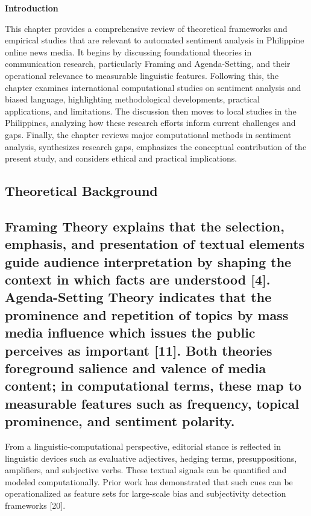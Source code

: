 \textbf{Introduction}

This chapter provides a comprehensive review of theoretical frameworks and empirical studies that are relevant to automated sentiment analysis in Philippine online news media. It begins by discussing foundational theories in communication research, particularly Framing and Agenda-Setting, and their operational relevance to measurable linguistic features. Following this, the chapter examines international computational studies on sentiment analysis and biased language, highlighting methodological developments, practical applications, and limitations. The discussion then moves to local studies in the Philippines, analyzing how these research efforts inform current challenges and gaps. Finally, the chapter reviews major computational methods in sentiment analysis, synthesizes research gaps, emphasizes the conceptual contribution of the present study, and considers ethical and practical implications.

\subsection{\texorpdfstring{\textbf{Theoretical Background}}{Theoretical Background}}\label{theoretical-background}

\subsection{Framing Theory explains that the selection, emphasis, and presentation of textual elements guide audience interpretation by shaping the context in which facts are understood {[}4{]}. Agenda-Setting Theory indicates that the prominence and repetition of topics by mass media influence which issues the public perceives as important {[}11{]}. Both theories foreground salience and valence of media content; in computational terms, these map to measurable features such as frequency, topical prominence, and sentiment polarity.}\label{framing-theory-explains-that-the-selection-emphasis-and-presentation-of-textual-elements-guide-audience-interpretation-by-shaping-the-context-in-which-facts-are-understood-4.-agenda-setting-theory-indicates-that-the-prominence-and-repetition-of-topics-by-mass-media-influence-which-issues-the-public-perceives-as-important-11.-both-theories-foreground-salience-and-valence-of-media-content-in-computational-terms-these-map-to-measurable-features-such-as-frequency-topical-prominence-and-sentiment-polarity.}

From a linguistic-computational perspective, editorial stance is reflected in linguistic devices such as evaluative adjectives, hedging terms, presuppositions, amplifiers, and subjective verbs. These textual signals can be quantified and modeled computationally. Prior work has demonstrated that such cues can be operationalized as feature sets for large-scale bias and subjectivity detection frameworks {[}20{]}.

